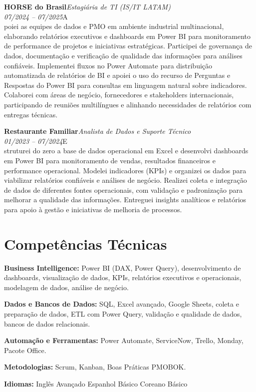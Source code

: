 \documentclass[11pt,a4paper]{article}
\newcommand{\cvrole}[4]{%
  \vspace{4pt}%
  {\bfseries\color{accentcolor}#1}\hfill{\itshape #2}\\[-2pt]%
  {\itshape #3}\hfill #4\\[6pt]%
}
\begin{document}
\cvrole{HORSE do Brasil}{Estagiária de TI (IS/IT LATAM)}{07/2024 -- 07/2025}

Apoiei as equipes de dados e PMO em ambiente industrial multinacional, elaborando relatórios executivos e dashboards em Power BI para monitoramento de performance de projetos e iniciativas estratégicas. Participei de governança de dados, documentação e verificação de qualidade das informações para análises confiáveis. Implementei fluxos no Power Automate para distribuição automatizada de relatórios de BI e apoiei o uso do recurso de Perguntas e Respostas do Power BI para consultas em linguagem natural sobre indicadores. Colaborei com áreas de negócio, fornecedores e stakeholders internacionais, participando de reuniões multilíngues e alinhando necessidades de relatórios com entregas técnicas.

\cvrole{Restaurante Familiar}{Analista de Dados e Suporte Técnico}{01/2023 -- 07/2024}

Estruturei do zero a base de dados operacional em Excel e desenvolvi dashboards em Power BI para monitoramento de vendas, resultados financeiros e performance operacional. Modelei indicadores (KPIs) e organizei os dados para viabilizar relatórios confiáveis e análises de negócio. Realizei coleta e integração de dados de diferentes fontes operacionais, com validação e padronização para melhorar a qualidade das informações. Entreguei insights analíticos e relatórios para apoio à gestão e iniciativas de melhoria de processos.

\section{Competências Técnicas}

\textbf{Business Intelligence:} Power BI (DAX, Power Query), desenvolvimento de dashboards, visualização de dados, KPIs, relatórios executivos e operacionais, modelagem de dados, análise de negócio.

\textbf{Dados e Bancos de Dados:} SQL, Excel avançado, Google Sheets, coleta e preparação de dados, ETL com Power Query, validação e qualidade de dados, bancos de dados relacionais.

\textbf{Automação e Ferramentas:} Power Automate, ServiceNow, Trello, Monday, Pacote Office.

\textbf{Metodologias:} Scrum, Kanban, Boas Práticas PMOBOK.

\textbf{Idiomas:} Inglês Avançado \enspace\textbullet\enspace Espanhol Básico \enspace\textbullet\enspace Coreano Básico
\end{document}
